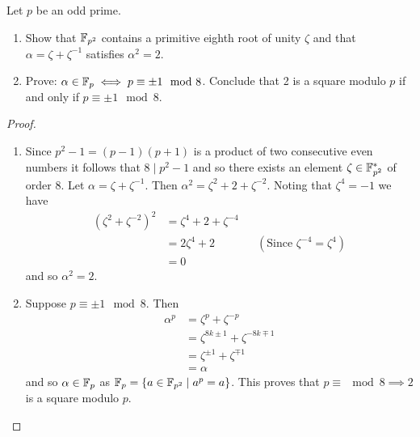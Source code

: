 \begin{ex}{22.13}
    Let $p$ be an odd prime. 
    \begin{enumerate}
        \item Show that $\mathbb{F}_{p^2}$ contains a primitive eighth root of unity $\zeta$ and that $\alpha=\zeta+\zeta^{-1}$ satisfies $\alpha^2=2$.
        \item Prove: $\alpha\in\mathbb{F}_p\iff p\equiv\pm 1\mod 8$. Conclude that 2 is a square modulo $p$ if and only if $p\equiv\pm 1\mod 8$.
    \end{enumerate}
\end{ex}
\begin{proof}
    ${}$
    \begin{enumerate}
        \item Since $p^2-1=(p-1)(p+1)$ is a product of two consecutive even numbers it follows that $8\mid p^2-1$ and so there exists an element $\zeta\in\mathbb{F}_{p^2}^*$ of order 8.
            Let $\alpha=\zeta+\zeta^{-1}$. Then $\alpha^2=\zeta^2+2+\zeta^{-2}$. Noting that $\zeta^4=-1$ we have
            \begin{align*}
                \left(\zeta^2+\zeta^{-2}\right)^2&=\zeta^4+2+\zeta^{-4}\\
                &=2\zeta^4+2&&(\text{Since }\zeta^{-4}=\zeta^4)\\
                &=0
            \end{align*}
            and so $\alpha^2=2$. 
        \item Suppose $p\equiv\pm 1\mod 8$. Then 
            \begin{align*}
                \alpha^p &= \zeta^p+\zeta^{-p}\\
                &=\zeta^{8k\pm 1}+\zeta^{-8k\mp 1}\\
                &=\zeta^{\pm 1}+\zeta^{\mp 1}\\
                &=\alpha
            \end{align*}
            and so $\alpha\in\mathbb{F}_p$ as $\mathbb{F}_p=\{a\in\mathbb{F}_{p^2}\mid a^p = a\}$. 
            This proves that $p\equiv\mod 8\implies 2$ is a square modulo $p$. 


\end{enumerate}
\end{proof}
